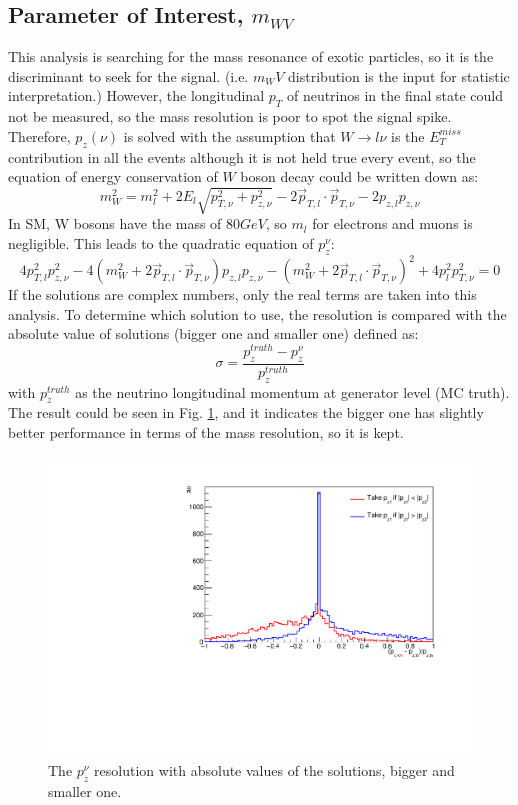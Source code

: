 \subsection{Parameter of Interest, $m_{WV}$}
This analysis is searching for the mass resonance of exotic particles, so it is the discriminant to seek for the signal. (i.e. $m_WV$ distribution is the input for statistic interpretation.) However, the longitudinal $p_{T}$ of neutrinos in the final state could not be measured, so the mass resolution is poor to spot the signal spike. Therefore, $p_{z}(\nu)$ is solved with the assumption that $W\rightarrow l\nu$ is the $E^{miss}_{T}$ contribution in all the events although it is not held true every event, so the equation of energy conservation of $W$ boson decay could be written down as:
\begin{equation}
m^2_W = m_{l}^{2} + 2E_{l}\sqrt{ p_{T,\nu}^2 + p_{z,\nu}^{2} }  - 2 \vec{p}_{{T},l} \cdot \vec{p}_{T, \nu} - 2 p_{z, l} p_{z,\nu}
\end{equation}
\noindent
In SM, W bosons have the mass of $80GeV$, so $m_{l}$ for electrons and muons is negligible. This leads to the quadratic equation of $p_{z}^\nu$:
\begin{equation}
4p_{{T}, l}^{2} p_{z,\nu}^{2} - 4 \left( m_{W}^{2} + 2 \vec{p}_{{T}, l} \cdot \vec{p}_{{T},\nu} \right) p_{z,l} p_{z, \nu} - \left( m_{W}^{2} + 2\vec{p}_{{T}, l} \cdot \vec{p}_{{T},\nu}  \right)^{2} +4p_l^{2} p_{{T},\nu}^{2} = 0
\end{equation}
\noindent
If the solutions are complex numbers, only the real terms are taken into this analysis. To determine which solution to use, the resolution is compared with the absolute value of solutions (bigger one and smaller one) defined as:
\begin{equation}
\sigma = \frac{p_z^{truth}-p_z^{\nu}}{p_z^{truth}}
\end{equation}
\noindent
with $p_z^{truth}$ as the neutrino longitudinal momentum at generator level (MC truth). The result could be seen in Fig. \ref{Fig:netrinoPz}, and it indicates the bigger one has slightly better performance in terms of the mass resolution, so it is kept.  
\begin{figure}
	\centering
    \includegraphics[width=0.5\hsize]{Chapter3/neutrinoPz}
    \caption{The $p_{z}^\nu$ resolution with absolute values of the solutions, bigger and smaller one. }
    \label{Fig:netrinoPz}
\end{figure}
